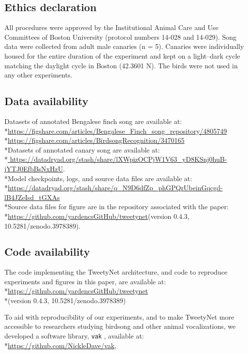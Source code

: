\documentclass[9pt,lineno]{elife}
\begin{document}
\subsection{Ethics declaration}
All procedures were approved by the 
Institutional Animal Care and Use Committees of Boston University (protocol numbers 14-028 and 14-029). 
Song data were collected from adult male canaries (n = 5). 
Canaries were individually housed for the entire duration of the experiment 
and kept on a light–dark cycle matching the daylight cycle in Boston (42.3601 N). 
The birds were not used in any other experiments.

\subsection{Data availability}
Datasets of annotated Bengalese finch song are available at:
\\*\url{https://figshare.com/articles/Bengalese_Finch_song_repository/4805749}
\\*\url{https://figshare.com/articles/BirdsongRecognition/3470165}
\\*Datasets of annotated canary song are available at:
\\*\url{ https://datadryad.org/stash/share/lXWpizOCPjW1V63_yD8KSnj0huB-jYTJ0EfbBsNxHzU}.
\\*Model checkpoints, logs, and source data files are available at: \\*\url{https://datadryad.org/stash/share/q_N9D6dfZp_phGPQrUbeinGqcgd-lB4JZeIsd_tGXAs}
\\*Source data files for figure are in the repository associated with the paper:
\\*\url{https://github.com/yardencsGitHub/tweetynet}(version 0.4.3, 10.5281/zenodo.3978389).

\subsection{Code availability}
\label{methods:code}
The code implementing the TweetyNet architecture,
and code to reproduce experiments and figures in this paper, 
are available at:
\\*\url{https://github.com/yardencsGitHub/tweetynet}
\\*(version 0.4.3, 10.5281/zenodo.3978389)

To aid with reproducibility of our experiments,
and to make TweetyNet more accessible to researchers studying birdsong
and other animal vocalizations, we developed a software library, 
\texttt{vak} \citep{Nicholson_vak_2021}, available at:
\\*\url{https://github.com/NickleDave/vak}, 
\end{document}
